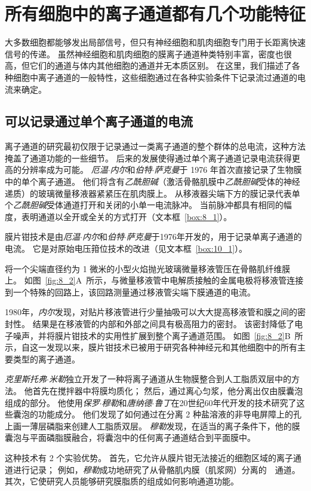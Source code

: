\section{所有细胞中的离子通道都有几个功能特征}

大多数细胞都能够发出局部信号，但只有神经细胞和肌肉细胞专门用于长距离快速信号的传递。
虽然神经细胞和肌肉细胞的膜离子通道种类特别丰富，密度也很高，但它们的通道与体内其他细胞的通道并无本质区别。
在这里，我们描述了各种细胞中离子通道的一般特性，这些细胞通过在各种实验条件下记录流过通道的电流来确定。



\subsection{可以记录通过单个离子通道的电流}

离子通道的研究最初仅限于记录通过一类离子通道的整个群体的总电流，这种方法掩盖了通道功能的一些细节。
后来的发展使得通过单个离子通道记录电流获得更高的分辨率成为可能。
\textit{厄温$\cdot$内尔}和\textit{伯特$\cdot$萨克曼}于 1976 年首次直接记录了生物膜中的单个离子通道。
他们将含有\textit{乙酰胆碱}（激活骨骼肌膜中\textit{乙酰胆碱}受体的神经递质）的玻璃微量移液器紧紧压在肌肉膜上。
从移液器尖端下方的膜记录代表单个\textit{乙酰胆碱}受体通道打开和关闭的小单一电流脉冲。
当前脉冲都具有相同的幅度，表明通道以全开或全关的方式打开（文本框~\ref{box:8_1}）。


\begin{proposition} \label{box:8_1}
	
	\quad \quad 膜片钳技术是由\textit{厄温$\cdot$内尔}和\textit{伯特$\cdot$萨克曼}于1976年开发的，用于记录单离子通道的电流。
	它是对原始电压箝位技术的改进（见文本框~\ref{box:10_1}）。
	
	\quad \quad 将一个尖端直径约为 1 微米的小型火焰抛光玻璃微量移液管压在骨骼肌纤维膜上。
	如图~\ref{fig:8_2}A~所示，与微量移液管中电解质接触的金属电极将移液管连接到一个特殊的回路上，该回路测量通过移液管尖端下膜通道的电流。
	
	\quad \quad 1980年，\textit{内尔}发现，对贴片移液管进行少量抽吸可以大大提高移液管和膜之间的密封性。
	结果是在移液管的内部和外部之间具有极高阻力的密封。
	该密封降低了电子噪声，并将膜片钳技术的实用性扩展到整个离子通道范围。
	如图~\ref{fig:8_2}B~所示，自这一发现以来，膜片钳技术已被用于研究各种神经元和其他细胞中的所有主要类型的离子通道。
	
	\quad \quad \textit{克里斯托弗$\cdot$米勒}独立开发了一种将离子通道从生物膜整合到人工脂质双层中的方法。
	他首先在搅拌器中将膜均质化；
	然后，通过离心匀浆，他分离出仅由膜囊泡组成的部分。
	他使用\textit{保罗$\cdot$穆勒}和\textit{唐纳德$\cdot$鲁丁}在20世纪60年代开发的技术研究了这些囊泡的功能成分。
	他们发现了如何通过在分离 2 种盐溶液的非导电屏障上的孔上画一薄层磷脂来创建人工脂质双层。
	\textit{穆勒}发现，在适当的离子条件下，他的膜囊泡与平面磷脂膜融合，将囊泡中的任何离子通道结合到平面膜中。
	
	\quad \quad 这种技术有 2 个实验优势。
	首先，它允许从膜片钳无法接近的细胞区域的离子通道进行记录；
	例如，\textit{穆勒}成功地研究了从骨骼肌内膜（肌浆网）分离的~~通道。
	其次，它使研究人员能够研究膜脂质的组成如何影响通道功能。
	
\end{proposition}


